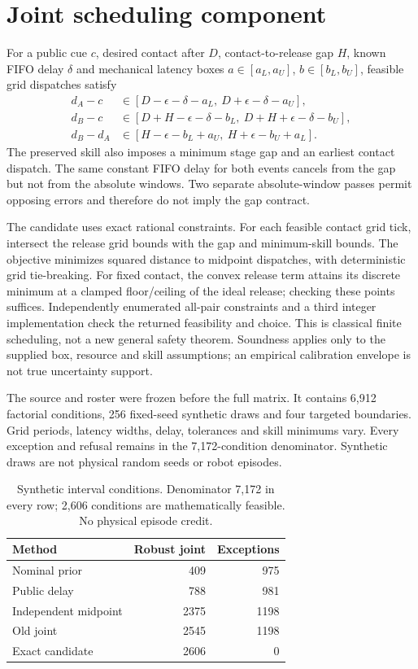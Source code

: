 \documentclass{article}
\begin{document}
\section{Joint scheduling component}
For a public cue $c$, desired contact after $D$, contact-to-release gap $H$,
known FIFO delay $\delta$ and mechanical latency boxes
$a\in[a_L,a_U]$, $b\in[b_L,b_U]$, feasible grid dispatches satisfy
{\small\begin{align*}
d_A-c&\in[D-\epsilon-\delta-a_L,\ D+\epsilon-\delta-a_U],\\
d_B-c&\in[D+H-\epsilon-\delta-b_L,\ D+H+\epsilon-\delta-b_U],\\
d_B-d_A&\in[H-\epsilon-b_L+a_U,\ H+\epsilon-b_U+a_L].
\end{align*}}
The preserved skill also imposes a minimum stage gap and an earliest contact
dispatch. The same constant FIFO delay for both events cancels from the gap but not from the
absolute windows. Two separate absolute-window passes permit opposing errors
and therefore do not imply the gap contract.

The candidate uses exact rational constraints. For each feasible contact grid
tick, intersect the release grid bounds with the gap and minimum-skill bounds.
The objective minimizes squared distance to midpoint dispatches, with
deterministic grid tie-breaking. For fixed contact, the convex release term
attains its discrete minimum at a clamped floor/ceiling of the ideal release;
checking these points suffices. Independently enumerated all-pair constraints
and a third integer implementation check the returned feasibility and choice.
This is classical finite scheduling, not a new general safety theorem.
Soundness applies only to the supplied box, resource and skill assumptions;
an empirical calibration envelope is not true uncertainty support.

The source and roster were frozen before the full matrix. It contains 6,912
factorial conditions, 256 fixed-seed synthetic draws and four targeted
boundaries. Grid periods, latency widths, delay, tolerances and skill minimums
vary. Every exception and refusal remains in the 7,172-condition denominator.
Synthetic draws are not physical random seeds or robot episodes.

\begin{table}[t]\centering\small
\caption{Synthetic interval conditions. Denominator 7,172 in every row;
2,606 conditions are mathematically feasible. No physical episode credit.}
\begin{tabular}{lrr}\toprule
Method & Robust joint & Exceptions\\\midrule
Nominal prior & 409 & 975 \\
Public delay & 788 & 981 \\
Independent midpoint & 2375 & 1198 \\
Old joint & 2545 & 1198 \\
Exact candidate & 2606 & 0 \\
\bottomrule\end{tabular}\end{table}
\end{document}
